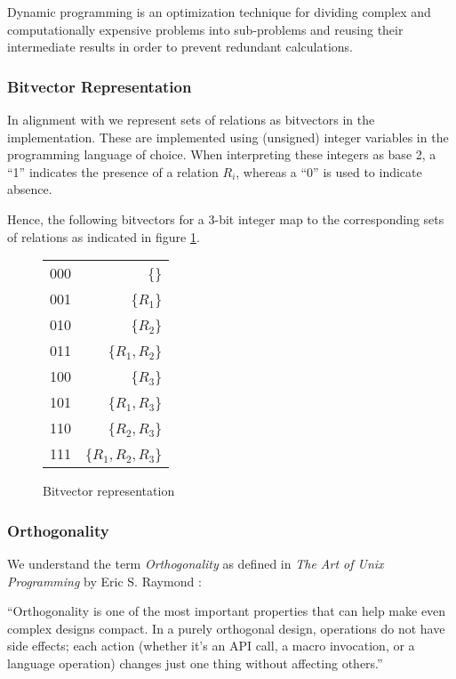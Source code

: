 Dynamic programming is an optimization technique for dividing complex and computationally expensive problems into sub-problems and reusing their intermediate results in order to prevent redundant calculations.

\subsubsection{Bitvector Representation}
\label{subsub:basics-bitvector}

In alignment with \cite{moerkotte2009building} we represent sets of relations as bitvectors in the implementation. These are implemented using (unsigned) integer variables in the programming language of choice. When interpreting these integers as base 2, a ``1'' indicates the presence of a relation $R_i$, whereas a ``0'' is used to indicate absence.

\begin{example}
    Hence, the following bitvectors for a 3-bit integer map to the corresponding sets of relations as indicated in figure \ref{fig:bitvector}.
    \begin{figure}[H]
        \begin{tabular}{ c | r }
            000 & \{\} \\ 
            001 & \{$R_1$\} \\
            010 & \{$R_2$\} \\
            011 & \{$R_1,R_2$\} \\
            100 & \{$R_3$\} \\
            101 & \{$R_1,R_3$\} \\
            110 & \{$R_2,R_3$\} \\
            111 & \{$R_1,R_2,R_3$\} \\
           \end{tabular}
        \caption{Bitvector representation}
        \label{fig:bitvector}
    \end{figure}
\end{example}

\subsubsection{Orthogonality}
We understand the term \textit{Orthogonality} as defined in \textit{The Art of Unix Programming} by Eric S. Raymond \cite{raymond2003compactness}:
\begin{definition}
    ``Orthogonality is one of the most important properties that can help make even complex designs compact. In a purely orthogonal design, operations do not have side effects; each action (whether it's an API call, a macro invocation, or a language operation) changes just one thing without affecting others.''
\end{definition}


